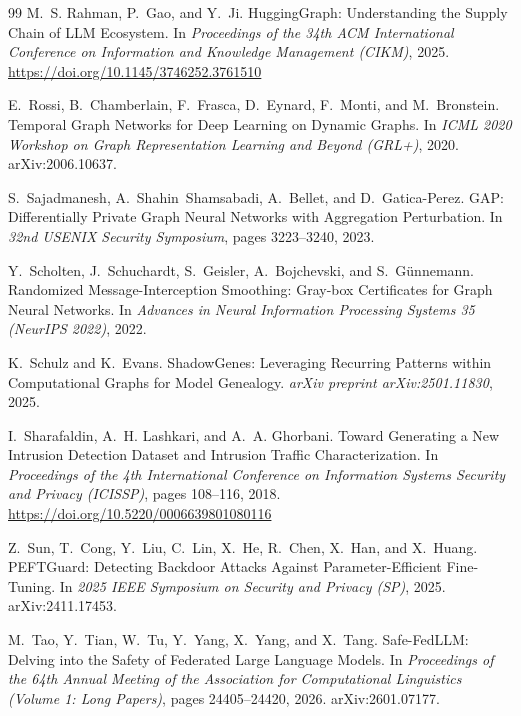 \begin{thebibliography}{99}
M.~S. Rahman, P.~Gao, and Y.~Ji.
\newblock HuggingGraph: Understanding the Supply Chain of LLM Ecosystem.
\newblock In \emph{Proceedings of the 34th ACM International Conference on Information and Knowledge Management (CIKM)}, 2025.
\newblock \url{https://doi.org/10.1145/3746252.3761510}

E.~Rossi, B.~Chamberlain, F.~Frasca, D.~Eynard, F.~Monti, and M.~Bronstein.
\newblock Temporal Graph Networks for Deep Learning on Dynamic Graphs.
\newblock In \emph{ICML 2020 Workshop on Graph Representation Learning and Beyond (GRL+)}, 2020.
\newblock arXiv:2006.10637.

S.~Sajadmanesh, A.~Shahin~Shamsabadi, A.~Bellet, and D.~Gatica-Perez.
\newblock GAP: Differentially Private Graph Neural Networks with Aggregation Perturbation.
\newblock In \emph{32nd USENIX Security Symposium}, pages 3223--3240, 2023.

Y.~Scholten, J.~Schuchardt, S.~Geisler, A.~Bojchevski, and S.~G{\"u}nnemann.
\newblock Randomized Message-Interception Smoothing: Gray-box Certificates for Graph Neural Networks.
\newblock In \emph{Advances in Neural Information Processing Systems 35 (NeurIPS 2022)}, 2022.

K.~Schulz and K.~Evans.
\newblock ShadowGenes: Leveraging Recurring Patterns within Computational Graphs for Model Genealogy.
\newblock \emph{arXiv preprint arXiv:2501.11830}, 2025.

I.~Sharafaldin, A.~H. Lashkari, and A.~A. Ghorbani.
\newblock Toward Generating a New Intrusion Detection Dataset and Intrusion Traffic Characterization.
\newblock In \emph{Proceedings of the 4th International Conference on Information Systems Security and Privacy (ICISSP)}, pages 108--116, 2018.
\newblock \url{https://doi.org/10.5220/0006639801080116}

Z.~Sun, T.~Cong, Y.~Liu, C.~Lin, X.~He, R.~Chen, X.~Han, and X.~Huang.
\newblock PEFTGuard: Detecting Backdoor Attacks Against Parameter-Efficient Fine-Tuning.
\newblock In \emph{2025 IEEE Symposium on Security and Privacy (SP)}, 2025.
\newblock arXiv:2411.17453.

M.~Tao, Y.~Tian, W.~Tu, Y.~Yang, X.~Yang, and X.~Tang.
\newblock Safe-FedLLM: Delving into the Safety of Federated Large Language Models.
\newblock In \emph{Proceedings of the 64th Annual Meeting of the Association for Computational Linguistics (Volume 1: Long Papers)}, pages 24405--24420, 2026.
\newblock arXiv:2601.07177.


\end{thebibliography}
